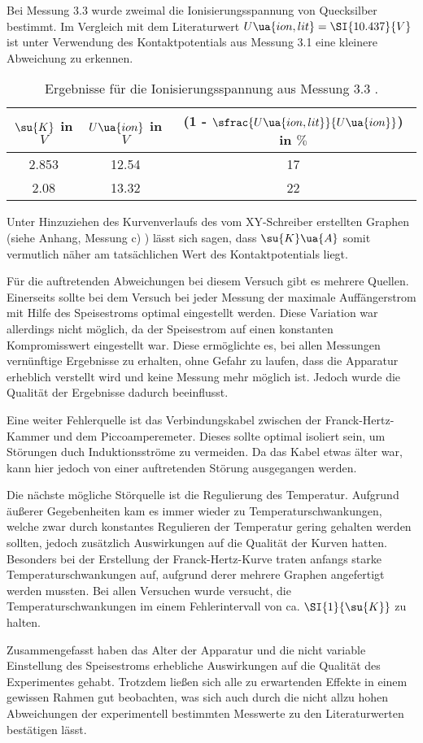 Bei Messung 3.3 wurde zweimal die Ionisierungsspannung von Quecksilber bestimmt.
Im Vergleich mit dem Literaturwert $U\ua{ion,lit} = \SI{10.437}{V}$\cite{Page01}
ist unter Verwendung des Kontaktpotentials
aus Messung 3.1 eine kleinere Abweichung zu erkennen.

\begin{table}
  \centering
  \caption{Ergebnisse für die Ionisierungsspannung aus Messung 3.3 .}
  \label{tab:Ergebniss}
  \begin{tabular}{c c c}
    \toprule
    $\su{K}$ in $\si{V}$ & $U\ua{ion}$ in $\si{V}$ & (1 - $\sfrac{U\ua{ion,lit}}{U\ua{ion}}$) in $\%$ \\
    \midrule
    2.853 & 12.54 & 17 \\
    2.08  & 13.32 & 22 \\
    \bottomrule
  \end{tabular}
\end{table}

Unter Hinzuziehen des Kurvenverlaufs
des vom XY-Schreiber erstellten Graphen (siehe Anhang, Messung c) ) lässt sich sagen,
dass $\su{K}\ua{A}$ somit vermutlich näher am tatsächlichen Wert des Kontaktpotentials
liegt.

Für die auftretenden Abweichungen bei diesem Versuch gibt es mehrere Quellen.
Einerseits sollte bei dem Versuch bei jeder Messung der maximale Auffängerstrom
mit Hilfe des Speisestroms optimal eingestellt werden. Diese Variation war allerdings
nicht möglich, da der Speisestrom auf einen konstanten Kompromisswert eingestellt
war. Diese ermöglichte es, bei allen Messungen vernünftige Ergebnisse zu
erhalten, ohne Gefahr zu laufen, dass die Apparatur erheblich verstellt wird und
keine Messung mehr möglich ist. Jedoch wurde
die Qualität der Ergebnisse dadurch beeinflusst.

Eine weiter Fehlerquelle ist das Verbindungskabel zwischen der Franck-Hertz-Kammer
und dem Piccoamperemeter. Dieses sollte optimal isoliert sein, um
Störungen duch Induktionsströme zu vermeiden. Da das Kabel etwas älter war, kann
hier jedoch von einer auftretenden Störung ausgegangen werden.

Die nächste mögliche Störquelle ist die Regulierung des Temperatur. Aufgrund
äußerer Gegebenheiten kam es immer wieder zu Temperaturschwankungen, welche
zwar durch konstantes Regulieren der Temperatur gering gehalten werden sollten,
jedoch zusätzlich Auswirkungen auf die Qualität der Kurven hatten. Besonders bei
der Erstellung der Franck-Hertz-Kurve traten anfangs starke Temperaturschwankungen
auf, aufgrund derer mehrere Graphen angefertigt werden mussten. Bei allen Versuchen
wurde versucht, die Temperaturschwankungen im einem Fehlerintervall von ca. $\SI{1}{\su{K}}$
zu halten.

Zusammengefasst haben das Alter der Apparatur und die nicht variable Einstellung
des Speisestroms erhebliche Auswirkungen auf die Qualität des Experimentes
gehabt. Trotzdem ließen sich alle zu erwartenden Effekte in einem gewissen
Rahmen gut beobachten, was sich auch durch die nicht allzu hohen Abweichungen
der experimentell bestimmten Messwerte zu den Literaturwerten bestätigen lässt.
